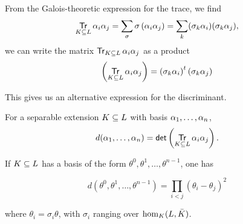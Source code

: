 From the Galois-theoretic expression for the trace, we find \[ \Tr
  \alpha_i\alpha_j = \sum_\sigma \sigma\left(\alpha_i\alpha_j\right) = \sum_k
  (\sigma_k \alpha_i) (\sigma_k \alpha_j), \] we can write the matrix $\Tr
  \alpha_i\alpha_j$ as a product \[ \left(\Tr \alpha_i\alpha_j \right) =
  \left(\sigma_k\alpha_i\right)^t \left(\sigma_k \alpha_j\right) \]

This gives us an alternative expression for the discriminant.

\begin{prop}
  For a separable extension $\ringExtension L K$ with basis $\iseqi\alpha n$,
  \[ d(\iseqi \alpha n) = \det \left(\Tr \alpha_i\alpha_j \right). \]
\end{prop}

\begin{prop}
  If $\ringExtension L K$ has a basis of the form
  $\theta^0,\theta^1,\ldots,\theta^{n-1}$, one has 
  
  \[ d(\theta^0,\theta^1,\ldots,\theta^{n-1}) = \prod_{i<j} (\theta_i -
  \theta_j)^2 \] 

  \medskip\noindent
  where $\theta_i = \sigma_i \theta$, with $\sigma_i$ ranging over $\kembk L$.
\end{prop}

